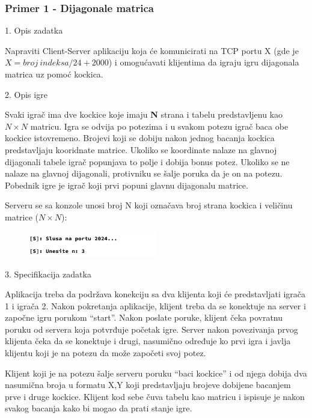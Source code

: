 \subsubsection{Primer 1 - Dijagonale matrica}

\large{1. Opis zadatka}
\normalsize

Napraviti Client-Server aplikaciju koja će komunicirati na TCP portu X (gde je $X = broj\ indeksa/24 + 2000$) i omogućavati klijentima da igraju igru dijagonala matrica uz pomoć kockica.

\large{2. Opis igre}
\normalsize

Svaki igrač ima dve kockice koje imaju \textbf{N} strana i tabelu predstavljenu kao \textbf{$N\times N$} matricu. Igra se odvija po potezima i u svakom potezu igrač baca obe kockice istovremeno. Brojevi koji se dobiju nakon jednog bacanja kockica predstavljaju kooridnate matrice. Ukoliko se koordinate nalaze na glavnoj dijagonali tabele igrač popunjava to polje i dobija bonus potez. Ukoliko se ne nalaze na glavnoj dijagonali, protivniku se šalje poruka da je on na potezu. Pobednik igre je igrač koji prvi popuni glavnu dijagonalu matrice.

Serveru se sa konzole unosi broj N koji označava broj strana kockica i veličinu matrice ($N\times N$):

\begin{figure}[H]
    \centering
    \includegraphics[width=0.5\textwidth]{Slike/DM/DM_Velicina_matrice.png}
    \label{fig:dm_velicina}
\end{figure}

\large{3. Specifikacija zadatka}
\normalsize

Aplikacija treba da podržava konekciju sa dva klijenta koji će predstavljati igrača 1 i igrača 2. Nakon pokretanja aplikacije, klijent treba da se konektuje na server i započne igru porukom “start”. Nakon poslate poruke, klijent čeka povratnu poruku od servera koja potvrđuje početak igre. Server nakon povezivanja prvog klijenta čeka da se konektuje i drugi, nasumično određuje ko prvi igra i javlja klijentu koji je na potezu da može započeti svoj potez.

Klijent koji je na potezu šalje serveru poruku “baci kockice” i od njega dobija dva nasumična broja u formatu {X,Y} koji predstavljaju brojeve dobijene bacanjem prve i druge kockice. Klijent kod sebe čuva tabelu kao matricu i ispisuje je nakon svakog bacanja kako bi mogao da prati stanje igre.

